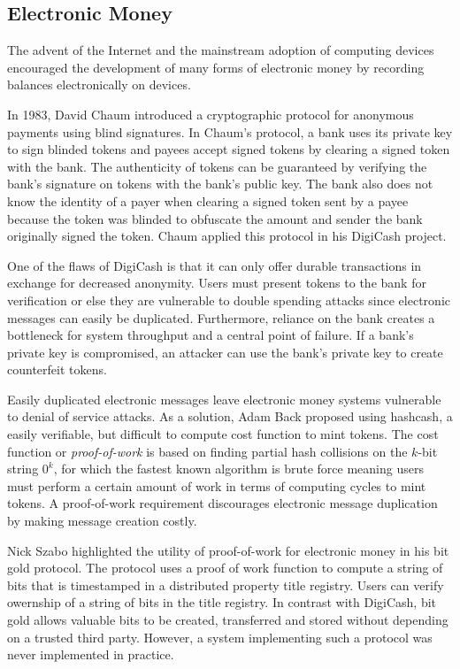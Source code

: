 \subsection{Electronic Money}

The advent of the Internet and the mainstream adoption of computing devices
encouraged the development of many forms of electronic money by recording
balances electronically on devices.

In 1983, David Chaum introduced a cryptographic protocol for anonymous payments using
blind signatures. In Chaum's protocol, a bank uses its private key to sign
blinded tokens and payees accept signed tokens by clearing a
signed token with the bank\cite{blindsignatures}. The authenticity of tokens can
be guaranteed by verifying the bank's signature on tokens with the bank's public
key. The bank also does not know the identity of a payer when clearing a signed
token sent by a payee because the token was blinded to obfuscate the amount and sender the bank
originally signed the token. Chaum applied this protocol in his DigiCash project.

One of the flaws of DigiCash is that it can only offer durable
transactions in exchange for decreased anonymity. Users must present tokens to
the bank for verification or else they are vulnerable to double spending attacks
since electronic messages can easily be duplicated\cite{camp1995}. Furthermore,
reliance on the bank creates a bottleneck for system throughput and a central
point of failure. If a bank's private key is compromised, an attacker can use
the bank's private key to create counterfeit tokens.

Easily duplicated electronic messages leave electronic money systems vulnerable
to denial of service attacks. As a solution, Adam Back proposed using hashcash, a
easily verifiable, but difficult to compute cost function to mint
tokens\cite{hashcash}. The cost function or \textit{proof-of-work} is based on finding partial hash
collisions on the $k$-bit string $0^{k}$, for which the fastest known algorithm
is brute force meaning users must perform a certain amount of work in terms of
computing cycles to mint tokens. A proof-of-work requirement discourages
electronic message duplication by making message creation costly.

Nick Szabo highlighted the utility of proof-of-work for electronic money in his bit gold protocol. The protocol
uses a proof of work function to compute a string of bits that is timestamped in a distributed property title registry\cite{bitgold}. Users can
verify owernship of a string of bits in the title registry. In contrast with
DigiCash, bit gold allows valuable bits to be created,
transferred and stored without depending on a trusted third party. However, a
system implementing such a protocol was never implemented in practice.

